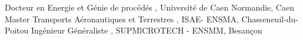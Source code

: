 %
%
%


\begin{scholarship}
					{Docteur en Energie et Génie de procédés ,    Université de Caen Normandie, Caen}
					{Master Transports Aéronautiques et Terrestres ,  ISAE- ENSMA, Chasseneuil-du-Poitou}
					{Ingénieur Généraliste ,   SUPMlCROTECH - ENSMM, Besançon}
	
\end{scholarship}
                    \newline
